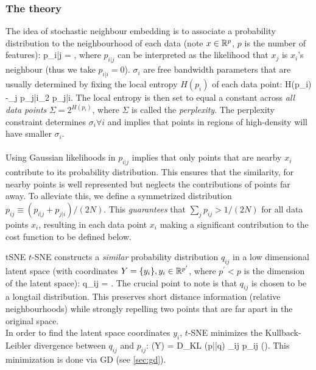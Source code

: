 \subsubsection{The theory}
The idea of stochastic neighbour embedding is to associate a probability distribution to the neighbourhood of each data (note $x\in \mathbb{R}^p$, $p$ is the number of features):
\be 
p_{i|j} = ,
\ee 
where $p_{i|j }$ can be interpreted as the likelihood that $x_j$ is $x_i$'s neighbour (thus we take $p_{i|i}=0$). $\sigma_i$ are free bandwidth parameters that are usually determined by fixing the local entropy $H(p_i)$ of each data point:
\be 
H(p_i) \equiv -\sum_j p_{j|i}\log_2 p_{j|i}.
\ee 
The local entropy is then set to equal a constant across \emph{all data points} $\Sigma = 2^{H(p_i)}$, where $\Sigma$ is called the \emph{perplexity}. The perplexity constraint determines $\sigma_i \forall i$ and implies that points in regions of high-density will have smaller $\sigma_i$.\\
\\
Using Gaussian likelihoods in $p_{i|j}$ implies that only points that are nearby $x_i$ contribute to its probability distribution. This ensures that the similarity, for nearby points is well represented but neglects the contributions of points far away. To alleviate this, we define a symmetrized distribution $p_{ij} \equiv (p_{i|j}+p_{j|i})/(2N)$. This \emph{guarantees} that $\sum_j p_{ij} >1/(2N)$ for all data points $x_i$, resulting in each data point $x_i$ making a significant contribution to the cost function to be defined below.
\begin{mybox}{tSNE}
	$t$-SNE constructs a \emph{similar} probability distribution $q_{ij}$ in a low dimensional latent space (with coordinates $Y=\{y_i\}, y_i \in \mathbb{R}^{p^\prime}$, where $p^\prime <p$ is the dimension of the latent space):
	\be 
	\label{eq:dimRedTSNEprobdistr}
	q_{ij} = .
	\ee 
	The crucial point to note is that $q_{ij}$ is chosen to be a longtail distribution. This preserves short distance information (relative neighbourhoods) while strongly repelling two points that are far apart in the original space.\\
	In order to find the latent space coordinates $y_i$, $t$-SNE minimizes the Kullback-Leibler divergence between $q_{ij}$ and $p_{ij}$:
	\be 
	\label{eq:dimRedTSNECostfct}
	\mC(Y) = D_{KL} (p||q) \equiv \sum_{ij} p_{ij} \log\left(\right).
	\ee 
	This minimization is done via GD (see \ref{sec:gd}).
\end{mybox}

